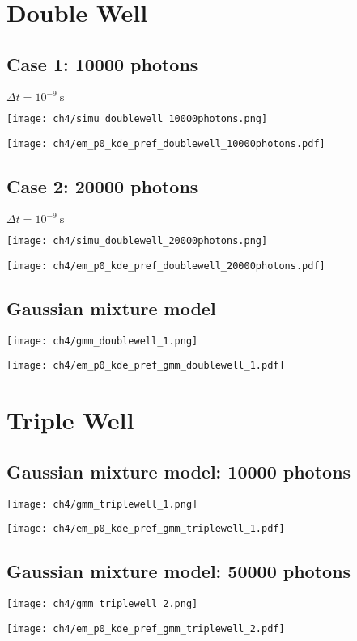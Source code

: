 \section{Double Well}
\subsection{Case 1: 10000 photons}
$\Delta t = 10^{-9}~\text{s}$
\begin{center}
    \texttt{[image: ch4/simu\_doublewell\_10000photons.png]} 
\end{center}
\begin{center}
    \texttt{[image: ch4/em\_p0\_kde\_pref\_doublewell\_10000photons.pdf]} 
\end{center}

\subsection{Case 2: 20000 photons}
$\Delta t = 10^{-9}~\text{s}$
\begin{center}
    \texttt{[image: ch4/simu\_doublewell\_20000photons.png]} 
\end{center}
\begin{center}
    \texttt{[image: ch4/em\_p0\_kde\_pref\_doublewell\_20000photons.pdf]} 
\end{center}

\subsection{Gaussian mixture model}
\begin{center}
    \texttt{[image: ch4/gmm\_doublewell\_1.png]} 
\end{center}
\begin{center}
    \texttt{[image: ch4/em\_p0\_kde\_pref\_gmm\_doublewell\_1.pdf]} 
\end{center}

\section{Triple Well}
\subsection{Gaussian mixture model: 10000 photons}
\begin{center}
    \texttt{[image: ch4/gmm\_triplewell\_1.png]} 
\end{center}
\begin{center}
    \texttt{[image: ch4/em\_p0\_kde\_pref\_gmm\_triplewell\_1.pdf]} 
\end{center}

\subsection{Gaussian mixture model: 50000 photons}
\begin{center}
    \texttt{[image: ch4/gmm\_triplewell\_2.png]} 
\end{center}
\begin{center}
    \texttt{[image: ch4/em\_p0\_kde\_pref\_gmm\_triplewell\_2.pdf]} 
\end{center}